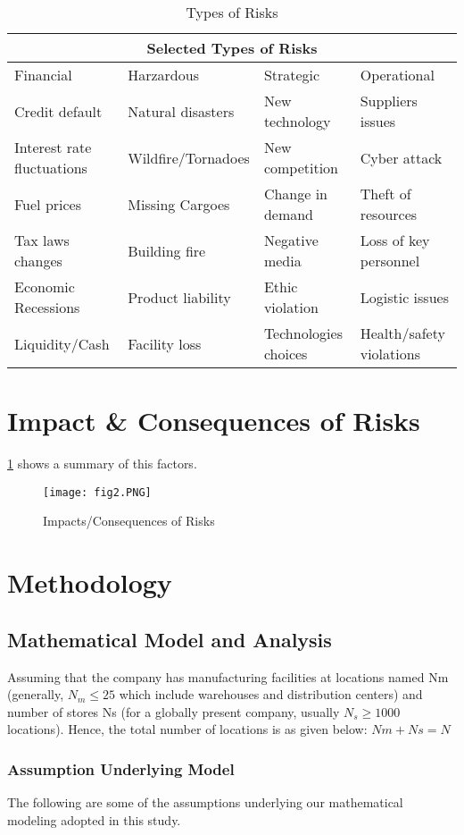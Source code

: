 \documentclass[conference]{IEEEtran}
\begin{document}
\begin{table}[h!]
\centering
\caption{Types of Risks}
\label{RiskTypes}
\begin{tabular}{|p{1.5cm}||p{1.5cm}|p{1.5cm}||p{1.5cm}|}
\hline
\multicolumn{4}{|c|}{Selected Types of Risks} \\
\hline
Financial & Harzardous & Strategic & Operational\\
\hline
Credit default & Natural disasters  & New technology &  Suppliers issues \\
Interest rate fluctuations & Wildfire/Tornadoes & New competition & Cyber attack \\
Fuel prices & Missing Cargoes & Change in demand &  Theft of resources \\
Tax laws changes & Building fire & Negative media & Loss of key personnel \\
Economic Recessions & Product liability & Ethic violation & Logistic issues \\
Liquidity/Cash & Facility loss  & Technologies choices & Health/safety violations \\
\hline
\end{tabular}
\end{table}

\section{Impact \& Consequences of Risks}
\ref{ImpactsConseqRisks} shows a summary of this factors.
\begin{figure}[h!]
\centering
\texttt{[image: fig2.PNG]}
\caption{Impacts/Consequences of Risks}
\label{ImpactsConseqRisks}
\end{figure}

\section{Methodology}
\subsection{Mathematical Model and Analysis}
Assuming that the company has manufacturing facilities at locations named Nm (generally, $N_m \leqslant 25$ which include warehouses and distribution centers) and number of stores Ns (for a globally present company, usually $N_s \geqslant 1000$ locations). Hence, the total number of locations is as given below:
$Nm + Ns=N$

\subsubsection{Assumption Underlying Model}
The following are some of the assumptions underlying our mathematical modeling adopted in this study.
	
\end{document}
